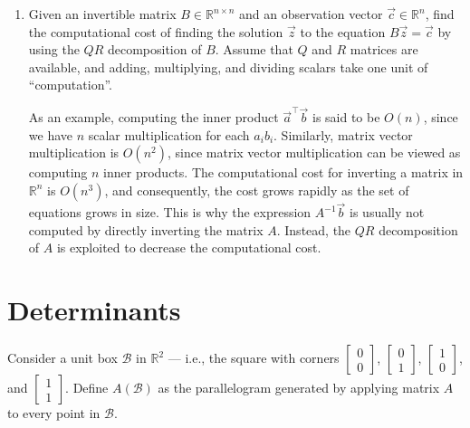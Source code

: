 \documentclass[10pt]{article}
\theoremstyle{definition}
\theoremstyle{plain}
\newcommand{\RR}{\mathbb{R}}
\newcommand{\vv}[1]{\vec{#1}}
\begin{document}
\begin{enumerate}[label=(\alph*)]
\item Given an invertible matrix $B \in \RR^{n \times n}$ and an observation vector $\vv{c} \in \RR^n$, find the computational cost of finding the solution $\vv{z}$ to the equation $B\vv{z} = \vv{c}$ by using the $QR$ decomposition of $B$. Assume that $Q$ and $R$ matrices are available, and adding, multiplying, and dividing scalars take one unit of ``computation''.

As an example, computing the inner product $\vv{a}^\top \vv{b}$ is said to be $O(n)$, since we have $n$ scalar multiplication for each $a_i b_i$. Similarly, matrix vector multiplication is $O(n^2)$, since matrix vector multiplication can be viewed as computing $n$ inner products. The computational cost for inverting a matrix in $\RR^n$ is $O(n^3)$, and consequently, the cost grows rapidly as the set of equations grows in size. This is why the expression $A^{-1}\vv{b}$ is usually not computed by directly inverting the matrix $A$. Instead, the $QR$ decomposition of $A$ is exploited to decrease the computational cost.
\end{enumerate}

\section{Determinants}

Consider a unit box $\mathcal{B}$ in $\RR^2$ --- i.e., the square with corners $\begin{bmatrix} 0 \\ 0 \end{bmatrix}$, $\begin{bmatrix} 0 \\ 1 \end{bmatrix}$, $\begin{bmatrix} 1 \\ 0 \end{bmatrix}$, and $\begin{bmatrix} 1 \\ 1 \end{bmatrix}$. Define $A(\mathcal{B})$ as the parallelogram generated by applying matrix $A$ to every point in $\mathcal{B}$.
\end{document}
